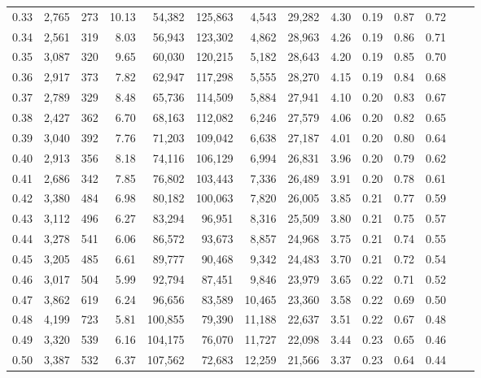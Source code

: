 \begin{tabular}{rrrrrrrrrrrrrr}
0.33 &  2,765 &  273 &   10.13 &   54,382 &  125,863 &   4,543 &  29,282 &  4.30 &  0.19 &  0.87 &      0.72 \\
0.34 &  2,561 &  319 &    8.03 &   56,943 &  123,302 &   4,862 &  28,963 &  4.26 &  0.19 &  0.86 &      0.71 \\
0.35 &  3,087 &  320 &    9.65 &   60,030 &  120,215 &   5,182 &  28,643 &  4.20 &  0.19 &  0.85 &      0.70 \\
0.36 &  2,917 &  373 &    7.82 &   62,947 &  117,298 &   5,555 &  28,270 &  4.15 &  0.19 &  0.84 &      0.68 \\
0.37 &  2,789 &  329 &    8.48 &   65,736 &  114,509 &   5,884 &  27,941 &  4.10 &  0.20 &  0.83 &      0.67 \\
0.38 &  2,427 &  362 &    6.70 &   68,163 &  112,082 &   6,246 &  27,579 &  4.06 &  0.20 &  0.82 &      0.65 \\
0.39 &  3,040 &  392 &    7.76 &   71,203 &  109,042 &   6,638 &  27,187 &  4.01 &  0.20 &  0.80 &      0.64 \\
0.40 &  2,913 &  356 &    8.18 &   74,116 &  106,129 &   6,994 &  26,831 &  3.96 &  0.20 &  0.79 &      0.62 \\
0.41 &  2,686 &  342 &    7.85 &   76,802 &  103,443 &   7,336 &  26,489 &  3.91 &  0.20 &  0.78 &      0.61 \\
0.42 &  3,380 &  484 &    6.98 &   80,182 &  100,063 &   7,820 &  26,005 &  3.85 &  0.21 &  0.77 &      0.59 \\
0.43 &  3,112 &  496 &    6.27 &   83,294 &   96,951 &   8,316 &  25,509 &  3.80 &  0.21 &  0.75 &      0.57 \\
0.44 &  3,278 &  541 &    6.06 &   86,572 &   93,673 &   8,857 &  24,968 &  3.75 &  0.21 &  0.74 &      0.55 \\
0.45 &  3,205 &  485 &    6.61 &   89,777 &   90,468 &   9,342 &  24,483 &  3.70 &  0.21 &  0.72 &      0.54 \\
0.46 &  3,017 &  504 &    5.99 &   92,794 &   87,451 &   9,846 &  23,979 &  3.65 &  0.22 &  0.71 &      0.52 \\
0.47 &  3,862 &  619 &    6.24 &   96,656 &   83,589 &  10,465 &  23,360 &  3.58 &  0.22 &  0.69 &      0.50 \\
0.48 &  4,199 &  723 &    5.81 &  100,855 &   79,390 &  11,188 &  22,637 &  3.51 &  0.22 &  0.67 &      0.48 \\
0.49 &  3,320 &  539 &    6.16 &  104,175 &   76,070 &  11,727 &  22,098 &  3.44 &  0.23 &  0.65 &      0.46 \\
0.50 &  3,387 &  532 &    6.37 &  107,562 &   72,683 &  12,259 &  21,566 &  3.37 &  0.23 &  0.64 &      0.44 \\

\end{tabular}

